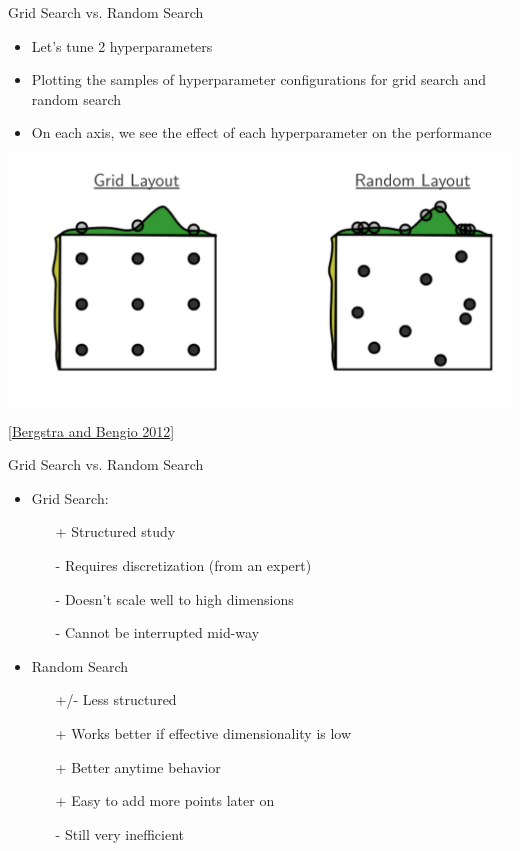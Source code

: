 \documentclass[aspectratio=169]{../latex_main/tntbeamer}  %
\begin{document}
\begin{frame}[c]{Grid Search vs. Random Search}

\vspace{-1em}
\begin{itemize}
    \item Let's tune 2 hyperparameters 
    \item Plotting the samples of hyperparameter configurations for grid search and random search
    \item On each axis, we see the effect of each hyperparameter on the performance
\end{itemize}

\centering
\includegraphics[width=.72\textwidth]{grid_random.jpg}

\footnotesize
[\href{https://www.jmlr.org/papers/volume13/bergstra12a/bergstra12a.pdf}{Bergstra and Bengio 2012}]


\end{frame}
\begin{frame}[c]{Grid Search vs. Random Search}
	
\begin{itemize}
    \item Grid Search:
    \begin{itemize}
        \item[+] Structured study
        \item[-] Requires discretization (from an expert)
        \item[-] Doesn't scale well to high dimensions
        \item[-] Cannot be interrupted mid-way
    \end{itemize}
    \item Random Search
    \begin{itemize}
        \item[+/-] Less structured
        \item[+] Works better if effective dimensionality is low 
        \item[+] Better anytime behavior
        \item[+] Easy to add more points later on
        \item[-] Still very inefficient
    \end{itemize}
\end{itemize}
\end{frame}
\end{document}
